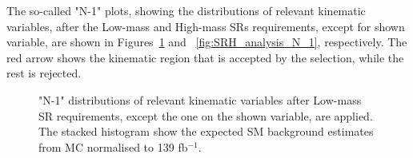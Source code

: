 	\begin{table}[!hbt]
	\centering
	\caption{Optimised selection for Low-mass and High-mass \acp{SR}.}
		
	\label{tab:analysis_SR}
	\end{table}
	The so-called "N-1" plots, showing the distributions of relevant kinematic variables, after the Low-mass and High-mass \acp{SR} requirements, except for shown variable, are shown in Figures~\ref{fig:SRL_analysis_N_1} and ~\ref{fig:SRH_analysis_N_1}, respectively. 
	The red arrow shows the kinematic region that is accepted by the selection, while the rest is rejected.
	\begin{figure}[!hbt]
	\begin{center}
			\hspace{0.05\textwidth}	 
			 \hspace{0.05\textwidth}
			\hspace{0.05\textwidth}	 
			 \hspace{0.05\textwidth}
		\end{center}
		\caption{"N-1" distributions of relevant kinematic variables after Low-mass \ac{SR} requirements, except the one on the shown variable, are applied. The stacked histogram show the expected \ac{SM} background estimates from \ac{MC} normalised to 139 fb$^{-1}$.}
	\label{fig:SRL_analysis_N_1}
	\end{figure}	
	 
